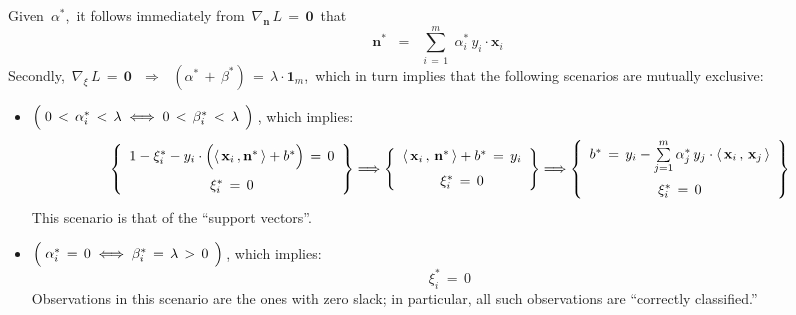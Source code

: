 Given \,$\alpha^{*}$,\, it follows immediately from \,$\nabla_{\mathbf{n}}\,L \,=\, \mathbf{0}$\, that
\begin{equation*}
\mathbf{n}^{*} \;\; = \;\; \overset{m}{\underset{i\,=\,1}{\sum}}\;\alpha_{i}^{*}\,y_{i}\cdot\mathbf{x}_{i}
\end{equation*}
Secondly, \,$\nabla_{\xi}\,L \,=\, \mathbf{0}$\,
\,$\Longrightarrow$\,
\,$ (\alpha^{*} \, + \, \beta^{*}) \, = \, \lambda\cdot\mathbf{1}_{m}$,\,
which in turn implies that the following scenarios are mutually exclusive:
\begin{itemize}
\item
	$\left(\; \overset{{\color{white}.}}{0} \,<\, \alpha_{i}^{*} \,<\, \lambda
	\; \Longleftrightarrow \;
	\overset{{\color{white}.}}{0} \,<\, \beta_{i}^{*} \,<\, \lambda \,\;\right)$\,,
	which implies:
	\begin{equation*}
		\left\{\begin{array}{c}
			1 - \xi_{i}^{*} - y_{i}\cdot\left(\langle\,\mathbf{x}_{i}\,,\mathbf{n}^{*}\,\rangle \overset{{\color{white}.}}{+} b^{*}\right) \, = \, 0
			\\
			\overset{{\color{white}-}}{\xi_{i}^{*}} \,=\, 0
			\end{array}\right\}
	\Longrightarrow
		\left\{\begin{array}{c}
			\langle\,\mathbf{x}_{i}\,,\,\mathbf{n}^{*}\,\rangle + b^{*} \,=\, y_{i}
			\\
			\overset{{\color{white}-}}{\xi_{i}^{*}} \,=\, 0
			\end{array}\right\}
	\Longrightarrow
		\left\{\begin{array}{c}
			b^{*} \,=\, y_{i} - \overset{m}{\underset{j=1}{\sum}}\,\alpha_{j}^{*}\,y_{j}\cdot\langle\,\mathbf{x}_{i}\,,\,\mathbf{x}_{j}\,\rangle
			\\
			\overset{{\color{white}-}}{\xi_{i}^{*}} \,=\, 0
			\end{array}\right\}
	\end{equation*}
	This scenario is that of the ``support vectors''.

\item
	$\left(\; \alpha_{i}^{*} \,=\, \overset{{\color{white}.}}{0}
	\; \Longleftrightarrow \;
	\beta_{i}^{*} \,=\, \lambda \,>\, \overset{{\color{white}.}}{0} \,\;\right)$\,,
	which implies:
	\begin{equation*}
		\xi_{i}^{*} \,=\, 0
	\end{equation*}
	Observations in this scenario are the ones with zero slack; in particular, all such observations are ``correctly classified.''


\end{itemize}
